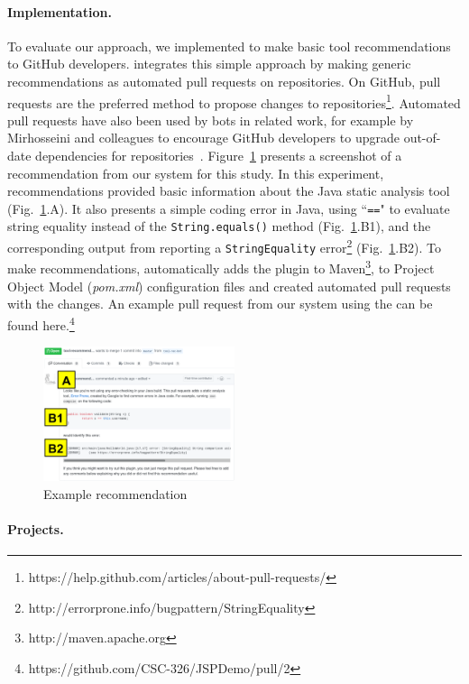 \paragraph{Implementation.} To evaluate our \telemarketer approach, we implemented \TOOL to make basic tool recommendations to GitHub developers. \TOOL integrates this simple approach by making generic recommendations as automated pull requests on repositories. On GitHub, pull requests are the preferred method to propose changes to repositories\footnote{https://help.github.com/articles/about-pull-requests/}. Automated pull requests have also been used by bots in related work, for example by Mirhosseini and colleagues to encourage GitHub developers to upgrade out-of-date dependencies for repositories~\cite{SamUgrade}. Figure~\ref{fig:tele} presents a screenshot of a recommendation from our system for this study. In this experiment, \TOOL recommendations provided basic information about the Java static analysis tool \EP  (Fig.~\ref{fig:tele}.A). It also presents a simple coding error in Java, using ``\texttt{==}" to evaluate string equality instead of the \texttt{String.equals()} method (Fig.~\ref{fig:tele}.B1), and the corresponding output from \EP reporting a \texttt{StringEquality} error\footnote{http://errorprone.info/bugpattern/StringEquality} (Fig.~\ref{fig:tele}.B2). To make recommendations, \TOOL automatically adds the \EP plugin to Maven\footnote{http://maven.apache.org}, to Project Object Model (\textit{pom.xml}) configuration files and created automated pull requests with the changes. An example pull request from our system using the \telemarketer can be found here.\footnote{https://github.com/CSC-326/JSPDemo/pull/2}

\begin{figure}
\centering
	\includegraphics[width=0.5\textwidth]{images/pull.png}
	\caption{Example \telemarketer recommendation}	
	\label{fig:tele} 
\end{figure}

\paragraph{Projects.}

